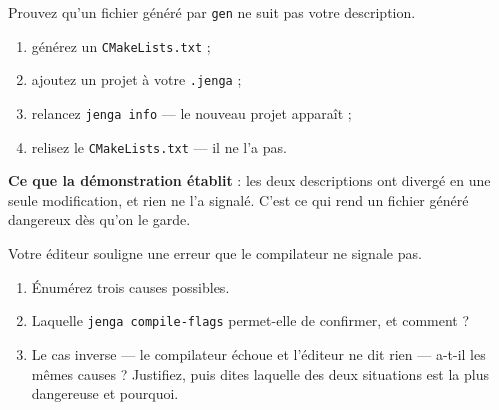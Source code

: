 \begin{nkdemo}
Prouvez qu'un fichier généré par \texttt{gen} ne suit pas votre description.

\begin{enumerate}
\item générez un \texttt{CMakeLists.txt} ;
\item ajoutez un projet à votre \texttt{.jenga} ;
\item relancez \texttt{jenga info} --- le nouveau projet apparaît ;
\item relisez le \texttt{CMakeLists.txt} --- il ne l'a pas.
\end{enumerate}

\textbf{Ce que la démonstration établit} : les deux descriptions ont divergé en
une seule modification, et rien ne l'a signalé. C'est ce qui rend un fichier
généré dangereux dès qu'on le garde.
\end{nkdemo}

\begin{nklogique}
Votre éditeur souligne une erreur que le compilateur ne signale pas.

\begin{enumerate}
\item Énumérez trois causes possibles.
\item Laquelle \texttt{jenga compile-flags} permet-elle de confirmer, et
      comment ?
\item Le cas inverse --- le compilateur échoue et l'éditeur ne dit rien --- a-t-il
      les mêmes causes ? Justifiez, puis dites laquelle des deux situations est
      la plus dangereuse et pourquoi.
\end{enumerate}
\end{nklogique}
